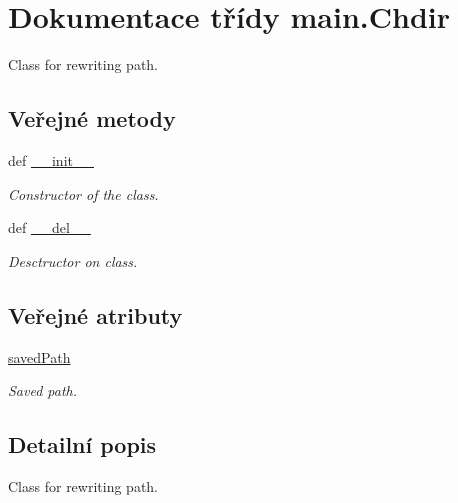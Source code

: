 \hypertarget{classmain_1_1Chdir}{\section{Dokumentace třídy main.\-Chdir}
\label{classmain_1_1Chdir}
}


Class for rewriting path.  


\subsection*{Veřejné metody}
\begin{DoxyCompactItemize}
\item 
def \hyperlink{classmain_1_1Chdir_ac7361f2ea260c83ed6b42a7047c80214}{\-\_\-\-\_\-init\-\_\-\-\_\-}
\begin{DoxyCompactList}\small\item\em Constructor of the class. \end{DoxyCompactList}\item 
def \hyperlink{classmain_1_1Chdir_add811e304912724c03da489a37cfe2d5}{\-\_\-\-\_\-del\-\_\-\-\_\-}
\begin{DoxyCompactList}\small\item\em Desctructor on class. \end{DoxyCompactList}\end{DoxyCompactItemize}
\subsection*{Veřejné atributy}
\begin{DoxyCompactItemize}
\item 
\hypertarget{classmain_1_1Chdir_a8fcc4e44e462eb780f7694ba60f226d9}{\hyperlink{classmain_1_1Chdir_a8fcc4e44e462eb780f7694ba60f226d9}{saved\-Path}}\label{classmain_1_1Chdir_a8fcc4e44e462eb780f7694ba60f226d9}

\begin{DoxyCompactList}\small\item\em Saved path. \end{DoxyCompactList}\end{DoxyCompactItemize}


\subsection{Detailní popis}
Class for rewriting path. 


